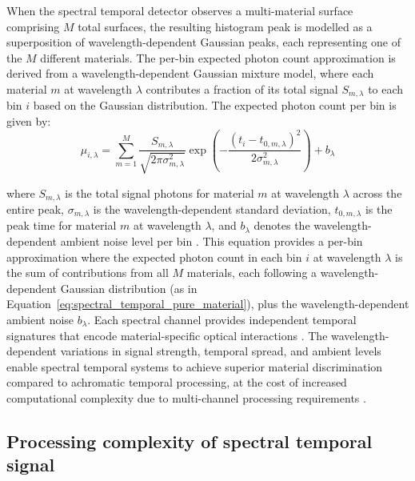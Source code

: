 \documentclass[12pt,a4paper,oneside]{report}
\begin{document}
When the spectral temporal detector observes a multi-material surface comprising $M$ total surfaces, the resulting histogram peak is modelled as a superposition of wavelength-dependent Gaussian peaks, each representing one of the $M$ different materials. The per-bin expected photon count approximation is derived from a wavelength-dependent Gaussian mixture model, where each material $m$ at wavelength $\lambda$ contributes a fraction of its total signal $S_{m,\lambda}$ to each bin $i$ based on the Gaussian distribution. The expected photon count per bin is given by:
\begin{equation}
\mu_{i,\lambda} = \sum_{m=1}^{M} \frac{S_{m,\lambda}}{\sqrt{2\pi\sigma_{m,\lambda}^2}} \exp\left(-\frac{(t_i - t_{0,m,\lambda})^2}{2\sigma_{m,\lambda}^2}\right) + b_\lambda
\label{eq:spectral_temporal_mixture}
\end{equation}

where $S_{m,\lambda}$ is the total signal photons for material $m$ at wavelength $\lambda$ across the entire peak, $\sigma_{m,\lambda}$ is the wavelength-dependent standard deviation, $t_{0,m,\lambda}$ is the peak time for material $m$ at wavelength $\lambda$, and $b_\lambda$ denotes the wavelength-dependent ambient noise level per bin \cite{tontini2020,koerner2021,heinz2001}. This equation provides a per-bin approximation where the expected photon count in each bin $i$ at wavelength $\lambda$ is the sum of contributions from all $M$ materials, each following a wavelength-dependent Gaussian distribution (as in Equation~\ref{eq:spectral_temporal_pure_material}), plus the wavelength-dependent ambient noise $b_\lambda$. Each spectral channel provides independent temporal signatures that encode material-specific optical interactions \cite{inagaki2020,su2016,becker2023}. The wavelength-dependent variations in signal strength, temporal spread, and ambient levels enable spectral temporal systems to achieve superior material discrimination compared to achromatic temporal processing, at the cost of increased computational complexity due to multi-channel processing requirements \cite{heinz2001}.


\subsection{Processing complexity of spectral temporal signal}
\label{subsubsec:processing_complexity_spectral_temporal}
\end{document}
